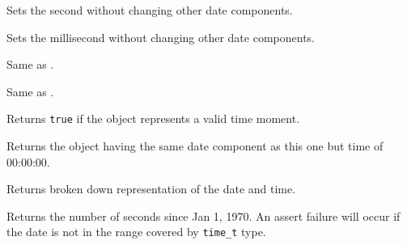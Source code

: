 
Sets the second without changing other date components.


\label{wxdatetimesetmillisecond}


Sets the millisecond without changing other date components.


\label{wxdatetimeoperatoreqtimet}


Same as .


\label{wxdatetimeoperatoreqtm}


Same as .



\label{wxdatetimeisvalid}


Returns {\tt true} if the object represents a valid time moment.


\label{wxdatetimegetdateonly}


Returns the object having the same date component as this one but time of
00:00:00.





\label{wxdatetimegettm}


Returns broken down representation of the date and time.


\label{wxdatetimegetticks}


Returns the number of seconds since Jan 1, 1970. An assert failure will occur
if the date is not in the range covered by {\tt time\_t} type.


